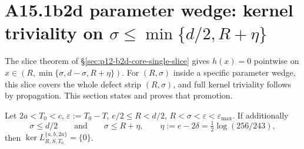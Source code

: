 \section{A15.1b2d parameter wedge: kernel triviality on
$\sigma \le \min\{d/2, R + \eta\}$}
\label{sec:p12-b2d-wedge}

The slice theorem of \S\ref{sec:p12-b2d-core-single-slice} gives
$h(x) = 0$ pointwise on $x \in (R, \min\{\sigma, d-\sigma, R+\eta\})$.
For $(R, \sigma)$ inside a specific parameter wedge, this slice
covers the whole defect strip $(R, \sigma)$, and full kernel
triviality follows by propagation.  This section states and proves
that promotion.

\begin{theorem}
\label{thm:p12-b2d-wedge}
Let $2a < T_0 < c$, $\varepsilon := T_0 - T$, $e/2 \le R < d/2$,
$R < \sigma < \varepsilon < \varepsilon_{\max}$.  If additionally
\[
\sigma \le d/2
\qquad\text{and}\qquad
\sigma \le R + \eta,
\qquad
\eta := e - 2 \delta = \tfrac12 \log(256/243),
\]
then
$\ker L_{R, S, T_0}^{\{a, b, 2a\}} = \{0\}$.
\end{theorem}

